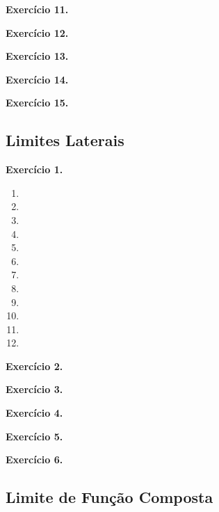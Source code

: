 \documentclass[12pt,a4paper]{article}
\begin{document}
\vspace{0.5cm}
\noindent\textbf{Exercício 11.}

\vspace{0.5cm}
\noindent\textbf{Exercício 12.}

\vspace{0.5cm}
\noindent\textbf{Exercício 13.}

\vspace{0.5cm}
\noindent\textbf{Exercício 14.}

\vspace{0.5cm}
\noindent\textbf{Exercício 15.}

\subsection{Limites Laterais}

\vspace{0.5cm}
\noindent\textbf{Exercício 1.}
\begin{enumerate}
    \renewcommand{\theenumi}{\alph{enumi}}
    \renewcommand{\labelenumi}{\theenumi)}
    \item 
    \item 
    \item 
    \item 
    \item 
    \item 
    \item 
    \item 
    \item 
    \item 
    \item 
    \item 
\end{enumerate}

\vspace{0.5cm}
\noindent\textbf{Exercício 2.}

\vspace{0.5cm}
\noindent\textbf{Exercício 3.}

\vspace{0.5cm}
\noindent\textbf{Exercício 4.}

\vspace{0.5cm}
\noindent\textbf{Exercício 5.}

\vspace{0.5cm}
\noindent\textbf{Exercício 6.}

\subsection{Limite de Função Composta}
\end{document}
